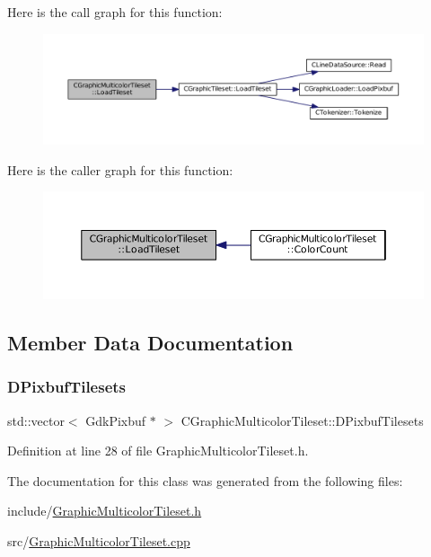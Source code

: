 Here is the call graph for this function\+:
\nopagebreak
\begin{figure}[H]
\begin{center}
\leavevmode
\includegraphics[width=350pt]{classCGraphicMulticolorTileset_a6ab975d5bc2ba0ed892de03bba9242cc_cgraph}
\end{center}
\end{figure}
Here is the caller graph for this function\+:
\nopagebreak
\begin{figure}[H]
\begin{center}
\leavevmode
\includegraphics[width=350pt]{classCGraphicMulticolorTileset_a6ab975d5bc2ba0ed892de03bba9242cc_icgraph}
\end{center}
\end{figure}


\subsection{Member Data Documentation}
\hypertarget{classCGraphicMulticolorTileset_a30809d113b0f314944425a3c8f21408c}{}\label{classCGraphicMulticolorTileset_a30809d113b0f314944425a3c8f21408c} 
\subsubsection{\texorpdfstring{D\+Pixbuf\+Tilesets}{DPixbufTilesets}}
{\footnotesize\ttfamily std\+::vector$<$ Gdk\+Pixbuf $\ast$ $>$ C\+Graphic\+Multicolor\+Tileset\+::\+D\+Pixbuf\+Tilesets\hspace{0.3cm}{\ttfamily [protected]}}



Definition at line 28 of file Graphic\+Multicolor\+Tileset.\+h.



The documentation for this class was generated from the following files\+:\begin{DoxyCompactItemize}
\item 
include/\hyperlink{GraphicMulticolorTileset_8h}{Graphic\+Multicolor\+Tileset.\+h}\item 
src/\hyperlink{GraphicMulticolorTileset_8cpp}{Graphic\+Multicolor\+Tileset.\+cpp}\end{DoxyCompactItemize}
